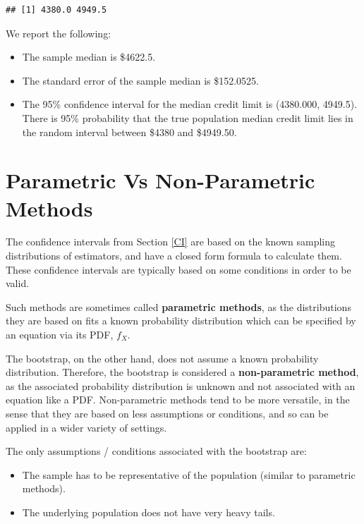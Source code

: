 \documentclass[
]{book}
\providecommand{\tightlist}{%
  \setlength{\itemsep}{0pt}\setlength{\parskip}{0pt}}
\theoremstyle{definition}
\theoremstyle{definition}
\theoremstyle{definition}
\theoremstyle{definition}
\theoremstyle{remark}
\begin{document}
\begin{verbatim}
## [1] 4380.0 4949.5
\end{verbatim}

We report the following:

\begin{itemize}
\tightlist
\item
  The sample median is \$4622.5.
\item
  The standard error of the sample median is \$152.0525.
\item
  The 95\% confidence interval for the median credit limit is (4380.000, 4949.5). There is 95\% probability that the true population median credit limit lies in the random interval between \$4380 and \$4949.50.
\end{itemize}

\hypertarget{parametric-vs-non-parametric-methods}{%
\section{Parametric Vs Non-Parametric Methods}\label{parametric-vs-non-parametric-methods}}

The confidence intervals from Section \ref{CI} are based on the known sampling distributions of estimators, and have a closed form formula to calculate them. These confidence intervals are typically based on some conditions in order to be valid.

Such methods are sometimes called \textbf{parametric methods}, as the distributions they are based on fits a known probability distribution which can be specified by an equation via its PDF, \(f_X\).

The bootstrap, on the other hand, does not assume a known probability distribution. Therefore, the bootstrap is considered a \textbf{non-parametric method}, as the associated probability distribution is unknown and not associated with an equation like a PDF. Non-parametric methods tend to be more versatile, in the sense that they are based on less assumptions or conditions, and so can be applied in a wider variety of settings.

The only assumptions / conditions associated with the bootstrap are:

\begin{itemize}
\tightlist
\item
  The sample has to be representative of the population (similar to parametric methods).
\item
  The underlying population does not have very heavy tails.
\end{itemize}
\end{document}
